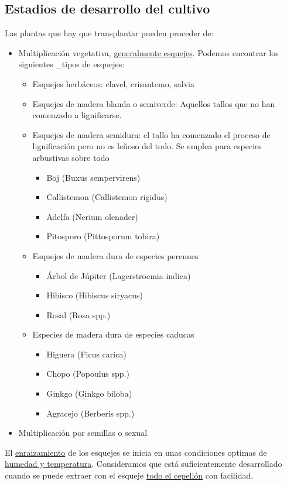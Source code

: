 \documentclass[a4paper,12pt,oneside]{article}
\begin{document}
\subsection{Estadios de desarrollo del cultivo}
\label{sec:orgd54a5ac}
Las plantas que hay que transplantar pueden proceder de:
\begin{itemize}
\item Multiplicación vegetativa, \uline{generalmente esquejes}. Podemos encontrar los
siguientes \_tipos de esquejes:
\begin{itemize}
\item Esquejes herbáceos: clavel, crisantemo, salvia
\item Esquejes de madera blanda o semiverde: Aquellos tallos que no han comenzado
a lignificarse.
\item Esquejes de madera semidura: el tallo ha comenzado el proceso de
lignificación pero no es leñoso del todo. Se emplea para especies arbustivas
sobre todo
\begin{itemize}
\item Boj (Buxus sempervirens)
\item Callistemon (Callistemon rigidus)
\item Adelfa (Nerium olenader)
\item Pitosporo (Pittosporum tobira)
\end{itemize}
\item Esquejes de madera dura de especies perennes
\begin{itemize}
\item Árbol de Júpiter (Lagerstroemia indica)
\item Hibisco (Hibiscus siryacus)
\item Rosal (Rosa spp.)
\end{itemize}
\item Especies de madera dura de especies caducas
\begin{itemize}
\item Higuera (Ficus carica)
\item Chopo (Popoulus spp.)
\item Ginkgo (Ginkgo biloba)
\item Agracejo (Berberis spp.)
\end{itemize}
\end{itemize}
\item Multiplicación por semillas o sexual
\end{itemize}

El \uline{enraizamiento} de los esquejes se inicia en unas condiciones optimas de
\uline{humedad y temperatura}. Consideramos que está suficientemente desarrollado
cuando se puede extraer con el esqueje \uline{todo el cepellón} con facilidad.
\end{document}
